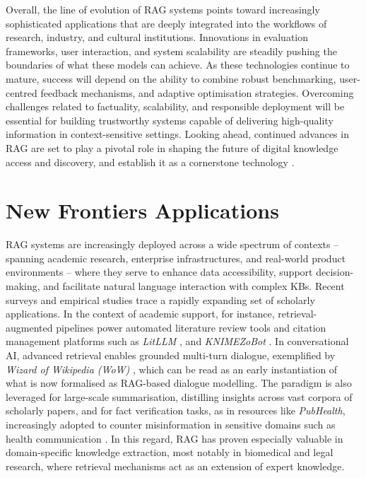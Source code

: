 \begin{spacing}{1.5}
Overall, the line of evolution of RAG systems points toward increasingly sophisticated applications that are deeply integrated into the workflows of research, industry, and cultural institutions. Innovations in evaluation frameworks, user interaction, and system scalability are steadily pushing the boundaries of what these models can achieve. As these technologies continue to mature, success will depend on the ability to combine robust benchmarking, user-centred feedback mechanisms, and adaptive optimisation strategies. Overcoming challenges related to factuality, scalability, and responsible deployment will be essential for building trustworthy systems capable of delivering high-quality information in context-sensitive settings. Looking ahead, continued advances in RAG are set to play a pivotal role in shaping the future of digital knowledge access and discovery, and establish it as a cornerstone technology \citep{zaib_conversational_2022,wang_searching_2024, gao_retrieval-augmented_2024}.

\section{New Frontiers Applications}\label{sec:evol_qas}
RAG systems are increasingly deployed across a wide spectrum of contexts -- spanning academic research, enterprise infrastructures, and real-world product environments -- where they serve to enhance data accessibility, support decision-making, and facilitate natural language interaction with complex KBs. Recent surveys and empirical studies trace a rapidly expanding set of scholarly applications. In the context of academic support, for instance, retrieval-augmented pipelines power automated literature review tools and citation management platforms such as \textit{LitLLM} \citep{agarwal_litllm_2025}, and \textit{KNIMEZoBot} \citep{alshammari_knimezobot_2023}. In conversational AI, advanced retrieval enables grounded multi-turn dialogue, exemplified by \textit{Wizard of Wikipedia (WoW)} \citep{dinan_wizard_2019}, which can be read as an early instantiation of what is now formalised as RAG-based dialogue modelling. The paradigm is also leveraged for large-scale summarisation, distilling insights across vast corpora of scholarly papers, and for fact verification tasks, as in resources like \textit{PubHealth}, increasingly adopted to counter misinformation in sensitive domains such as health communication \citep{kotonya_explainable_2020}. In this regard, RAG has proven especially valuable in domain-specific knowledge extraction, most notably in biomedical and legal research, where retrieval mechanisms act as an extension of expert knowledge.



\end{spacing}
